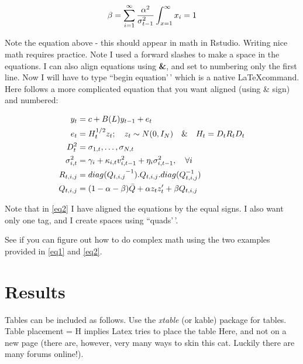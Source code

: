 \documentclass[12pt,preprint, authoryear]{elsarticle}
\numberwithin{equation}{section}
\numberwithin{figure}{section}
\numberwithin{table}{section}
\begin{document}
\[
\beta = \sum_{i = 1}^{\infty}\frac{\alpha^2}{\sigma_{t-1}^2} \\
\int_{x = 1}^{\infty}x_{i} = 1
\]

Note the equation above - this should appear in math in Rstudio. Writing
nice math requires practice. Note I used a forward slashes to make a
space in the equations. I can also align equations using \textbf{\&},
and set to numbering only the first line. Now I will have to type
``begin equation'\,' which is a native \LaTeX command. Here follows a
more complicated equation that you want aligned (using \& sign) and
numbered:

\begin{align}
    y_t &= c + B(L) y_{t-1} + e_t   \label{eq2}    \\ \notag
    e_t &= H_t^{1/2}  z_t ; \quad z_t \sim  N(0,I_N) \quad \& \quad H_t = D_tR_tD_t \\ \notag
        D_t^2 &= {\sigma_{1,t}, \dots, \sigma_{N,t}}   \\ \notag
        \sigma_{i,t}^2 &= \gamma_i+\kappa_{i,t}  v_{i, t-1}^2 +\eta_i  \sigma_{i, t-1}^2, \quad \forall i \\ \notag
        R_{t, i, j} &= {diag(Q_{t, i, j}}^{-1}) . Q_{t, i, j} . diag(Q_{t, i, j}^{-1})  \\ \notag
        Q_{t, i, j} &= (1-\alpha-\beta)  \bar{Q} + \alpha  z_t  z_t'  + \beta  Q_{t, i, j} \notag
\end{align}

Note that in \ref{eq2} I have aligned the equations by the equal signs.
I also want only one tag, and I create spaces using ``quads'\,'.

See if you can figure out how to do complex math using the two examples
provided in \ref{eq1} and \ref{eq2}.

\hypertarget{results}{%
\section{Results}\label{results}}

Tables can be included as follows. Use the \emph{xtable} (or kable)
package for tables. Table placement = H implies Latex tries to place the
table Here, and not on a new page (there are, however, very many ways to
skin this cat. Luckily there are many forums online!).
\end{document}
